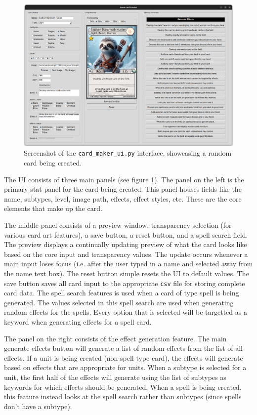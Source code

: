 \begin{figure}[h]
	\centering
	\includegraphics[width=\textwidth]{images/ui_sample.png}
	\caption{Screenshot of the \texttt{card\_maker\_ui.py} interface, showcasing a random card being created.}
	\label{fig:card_maker_ui_screenshot}
\end{figure}

The UI consists of three main panels (see figure \ref{fig:card_maker_ui_screenshot}). The panel on the left is the primary stat panel for the card being created. This panel houses fields like the name, subtypes, level, image path, effects, effect styles, etc. These are the core elements that make up the card. 

The middle panel consists of a preview window, transparency selection (for various card art features), a save button, a reset button, and a spell search field. The preview displays a continually updating preview of what the card looks like based on the core input and transparency values. The update occurs whenever a main input loses focus (i.e. after the user typed in a name and selected away from the name text box). The reset button simple resets the UI to default values. The save button saves all card input to the appropriate \texttt{csv} file for storing complete card data. The spell search features is used when a card of type spell is being generated. The values selected in this spell search are used when generating random effects for the spells. Every option that is selected will be targetted as a keyword when generating effects for a spell card.

The panel on the right consists of the effect generation feature. The main generate effects button will generate a list of random effects from the list of all effects. If a unit is being created (non-spell type card), the effects will generate based on effects that are appropriate for units. When a subtype is selected for a unit, the first half of the effects will generate using the list of subtypes as keywords for which effects should be generated. When a spell is being created, this feature instead looks at the spell search rather than subtypes (since spells don't have a subtype).

